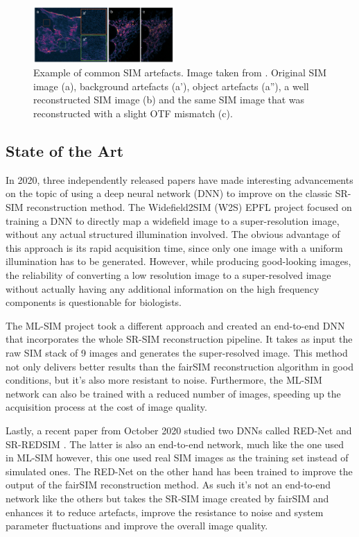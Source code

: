 \documentclass[conference]{IEEEtran}
\begin{document}
\begin{figure}[h]
    \centering
    \includegraphics[width=0.48\textwidth]{images/sim_artecats_showcase.jpg}
    \caption{Example of common SIM artefacts. Image taken from \cite{sim_artefacts_paper}. Original SIM image (a), background artefacts (a'), object artefacts (a''), a well reconstructed SIM image (b) and the same SIM image that was reconstructed with a slight OTF mismatch (c).}
    \label{fig:sim_artefacts_showcase}
\end{figure}

\subsection{State of the Art}
In 2020, three independently released papers have made interesting advancements on the topic of using a deep neural network (DNN) to improve on the classic SR-SIM reconstruction method. The Widefield2SIM (W2S) EPFL project \cite{W2S_paper} focused on training a DNN to directly map a widefield image to a super-resolution image, without any actual structured illumination involved. The obvious advantage of this approach is its rapid acquisition time, since only one image with a uniform illumination has to be generated. However, while producing good-looking images, the reliability of converting a low resolution image to a super-resolved image without actually having any additional information on the high frequency components is questionable for biologists.

The ML-SIM project \cite{mlsim_paper} took a different approach and created an end-to-end DNN that incorporates the whole SR-SIM reconstruction pipeline. It takes as input the raw SIM stack of 9 images and generates the super-resolved image. This method not only delivers better results than the fairSIM reconstruction algorithm in good conditions, but it's also more resistant to noise. Furthermore, the ML-SIM network can also be trained with a reduced number of images, speeding up the acquisition process at the cost of image quality.

Lastly, a recent paper from October 2020 studied two DNNs called RED-Net and SR-REDSIM \cite{sr-redsim_paper}. The latter is also an end-to-end network, much like the one used in ML-SIM however, this one used real SIM images as the training set instead of simulated ones. The RED-Net on the other hand has been trained to improve the output of the fairSIM reconstruction method. As such it's not an end-to-end network like the others but takes the SR-SIM image created by fairSIM and enhances it to reduce artefacts, improve the resistance to noise and system parameter fluctuations and improve the overall image quality.
\end{document}
